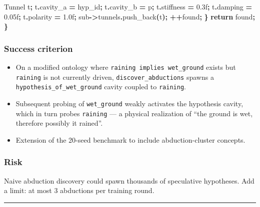 \documentclass[
  11pt,
  a4paper,
]{article}
\newenvironment{Shaded}{\begin{snugshade}}{\end{snugshade}}
\newcommand{\BuiltInTok}[1]{#1}
\newcommand{\ControlFlowTok}[1]{\textcolor[rgb]{0.13,0.29,0.53}{\textbf{#1}}}
\newcommand{\FloatTok}[1]{\textcolor[rgb]{0.00,0.00,0.81}{#1}}
\newcommand{\NormalTok}[1]{#1}
\newcommand{\OperatorTok}[1]{\textcolor[rgb]{0.81,0.36,0.00}{\textbf{#1}}}
\providecommand{\tightlist}{%
  \setlength{\itemsep}{0pt}\setlength{\parskip}{0pt}}
\begin{document}
\begin{Shaded}
\begin{Highlighting}[]
\NormalTok{        Tunnel t}\OperatorTok{;}
\NormalTok{        t}\OperatorTok{.}\NormalTok{cavity\_a }\OperatorTok{=}\NormalTok{ hyp\_id}\OperatorTok{;}
\NormalTok{        t}\OperatorTok{.}\NormalTok{cavity\_b }\OperatorTok{=}\NormalTok{ p}\OperatorTok{;}
\NormalTok{        t}\OperatorTok{.}\NormalTok{stiffness }\OperatorTok{=} \FloatTok{0.3}\BuiltInTok{f}\OperatorTok{;}
\NormalTok{        t}\OperatorTok{.}\NormalTok{damping }\OperatorTok{=} \FloatTok{0.05}\BuiltInTok{f}\OperatorTok{;}
\NormalTok{        t}\OperatorTok{.}\NormalTok{polarity }\OperatorTok{=} \FloatTok{1.0}\BuiltInTok{f}\OperatorTok{;}
\NormalTok{        sub}\OperatorTok{{-}\textgreater{}}\NormalTok{tunnels}\OperatorTok{.}\NormalTok{push\_back}\OperatorTok{(}\NormalTok{t}\OperatorTok{);}
        \OperatorTok{++}\NormalTok{found}\OperatorTok{;}
    \OperatorTok{\}}
    \ControlFlowTok{return}\NormalTok{ found}\OperatorTok{;}
\OperatorTok{\}}
\end{Highlighting}
\end{Shaded}

\subsubsection{Success criterion}\label{success-criterion-6}

\begin{itemize}
\tightlist
\item
  On a modified ontology where \texttt{raining\ implies\ wet\_ground}
  exists but \texttt{raining} is not currently driven,
  \texttt{discover\_abductions} spawns a
  \texttt{hypothesis\_of\_wet\_ground} cavity coupled to
  \texttt{raining}.
\item
  Subsequent probing of \texttt{wet\_ground} weakly activates the
  hypothesis cavity, which in turn probes \texttt{raining} --- a
  physical realization of ``the ground is wet, therefore possibly it
  rained''.
\item
  Extension of the 20-seed benchmark to include abduction-cluster
  concepts.
\end{itemize}

\subsubsection{Risk}\label{risk-3}

Naive abduction discovery could spawn thousands of speculative
hypotheses. Add a limit: at most 3 abductions per training round.

\begin{center}\rule{0.5\linewidth}{0.5pt}\end{center}
\end{document}
